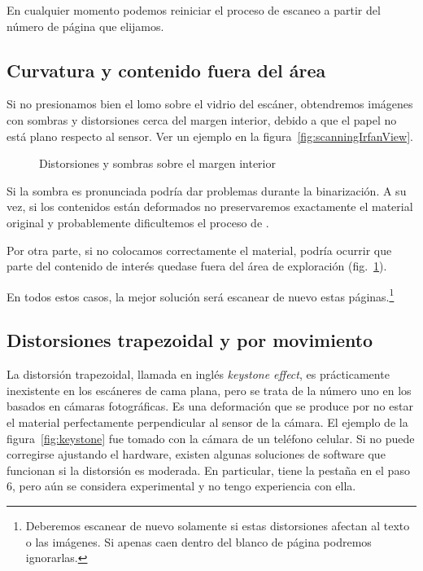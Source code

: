 \documentclass[%
	a5paper,
	10pt,
	twoside,
	openright,
	final,
]{memoir}
\begin{document}
{	En cualquier momento podemos reiniciar el proceso de escaneo a partir del número de página que elijamos.

	\subsection{Curvatura y contenido fuera del área} Si no presionamos bien el lomo sobre el vidrio del escáner, obtendremos imágenes con sombras y distorsiones cerca del margen interior, debido a que el papel no está plano respecto al sensor. Ver un ejemplo en la figura~\ref{fig:scanningIrfanView}.

	\begin{figure}
		\hfill
		\caption{Distorsiones y sombras sobre el margen interior\label{fig:distortion1}}
	\end{figure}

	Si la sombra es pronunciada podría dar problemas durante la binarización. A su vez, si los contenidos están deformados no preservaremos exactamente el material original y probablemente dificultemos el proceso de \ocr.

	Por otra parte, si no colocamos correctamente el material, podría ocurrir que parte del contenido de interés quedase fuera del área de exploración (fig.~\ref{fig:distortion1}).

	En todos estos casos, la mejor solución será escanear de nuevo estas páginas.\footnote{Deberemos escanear de nuevo solamente si estas distorsiones afectan al texto o las imágenes. Si apenas caen dentro del blanco de página podremos ignorarlas.}

	\subsection{Distorsiones trapezoidal y por movimiento} La distorsión trapezoidal, llamada en inglés \emph{keystone effect}, es prácticamente inexistente en los escáneres de cama plana, pero se trata de la número uno en los basados en cámaras fotográficas. Es una deformación que se produce por no estar el material perfectamente perpendicular al sensor de la cámara. El ejemplo de la figura~\ref{fig:keystone} fue tomado con la cámara de un teléfono celular. Si no puede corregirse ajustando el hardware, existen algunas soluciones de software que funcionan si la distorsión es moderada. En particular, \scantailor tiene la pestaña  en el paso 6, pero aún se considera experimental y no tengo experiencia con ella.

}
\end{document}
